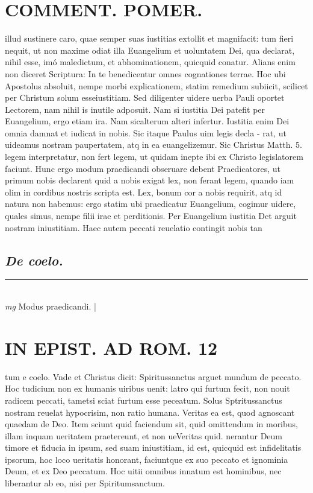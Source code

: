 \documentclass{article}
\begin{document}
\begin{pages}
\section*{COMMENT. POMER.  }\pstart illud sustinere caro, quae semper suas iustitias extollit et magnifacit: tum fieri nequit, ut non maxime odiat illa Euangelium et uoluntatem Dei, qua declarat, nihil esse, imó maledictum, et abhominationem, quicquid conatur. Alians enim non diceret Scriptura: In te benedicentur omnes cognationes terrae. Hoc ubi Apostolus absoluit, nempe morbi explicationem, statim remedium subiicit, scilicet per Christum solum esseiustitiam. Sed diligenter uidere uerba Pauli oportet Lectorem, nam nihil is inutile adposuit. Nam si iustitia Dei patefit per Euangelium, ergo etiam ira. Nam sicalterum alteri infertur. Iustitia enim Dei omnia damnat et iudicat in nobis. Sic itaque Paulus uim legis decla - rat, ut uideamus nostram paupertatem, atq in ea euangelizemur. Sic Christus Matth. 5. legem interpretatur, non fert legem, ut quidam inepte ibi ex Christo legislatorem faciunt. Hunc ergo modum praedicandi obseruare debent Praedicatores, ut primum nobis declarent quid a nobis exigat lex, non ferant legem, quando iam olim in cordibus nostris scripta est. Lex, bonum cor a nobis requirit, atq id natura non habemus: ergo statim ubi praedicatur Euangelium, cogimur uidere, quales simus, nempe filii irae et perditionis.   \pend\pstart Per Euangelium iustitia Det arguit nostram iniustitiam. Haec autem peccati reuelatio contingit nobis tan  \pend
{}
{}
\subsection*{\textit{De coelo. }}
\vspace{0.5cm}\noindent
\vspace{0.2cm}\rule{1cm}{0.2pt}\\ 
\hspace{0.2cm}\textit{mg}
\footnotesize Modus praedicandi.  
\normalsize| 
\section*{IN EPIST. AD ROM.  12 }
\marginpar{[ p.]}\pstart tum e coelo. Vnde et Christus dicit: Spiritussanctus arguet mundum de peccato. Hoc tudicium non ex humanis uiribus uenit: latro qui furtum fecit, non nouit radicem peccati, tametsi sciat furtum esse peceatum.  Solus Sptritussanctus nostram reuelat hypocrisim, non ratio humana.   \pend\pstart Veritas ea est, quod agnoscant quaedam de Deo.  Item sciunt quid faciendum sit, quid omittendum in moribus, illam inquam ueritatem praetereunt, et non ueVeritas quid.  nerantur Deum timore et fiducia in ipsum, sed suam iniustitiam, id est, quicquid est infidelitatis ipsorum, hoc loco ueritatis honorant, faciuntque ex suo peccato et ignominia Deum, et ex Deo peccatum. Hoc uitii omnibus innatum est hominibus, nec liberantur ab eo, nisi per Spiritumsanctum.  \pend
{}
{}

\end{pages}
\end{document}
